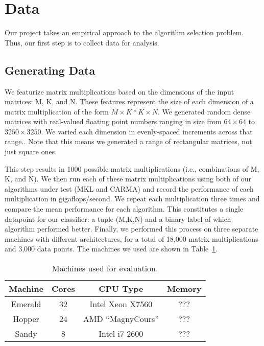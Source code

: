 \section{Data}
Our project takes an empirical approach to the algorithm selection problem.
Thus, our first step is to collect data for analysis.

\subsection{Generating Data}
We featurize matrix multiplications based on the dimensions of the input matrices: M, K, and N.
These features represent the size of each dimension of a matrix multiplication of the form $M\times{K} * K\times{N}$.
We generated random dense matrices with real-valued floating point numbers ranging in size from $64\times{64}$ to $3250\times{3250}$.
We varied each dimension in evenly-spaced increments across that range..
Note that this means we generated a range of rectangular matrices, not just square ones.

This step results in 1000 possible matrix multiplications (i.e., combinations of M, K, and N).
We then run each of these matrix multiplications using both of our algorithms under test (MKL and CARMA) and record the performance of each multiplication in gigaflops/second.
We repeat each multiplication three times and compare the mean performance for each algorithm.
This constitutes a single datapoint for our classifier: a tuple (M,K,N) and a binary label of which algorithm performed better.
Finally, we performed this process on three separate machines with different architectures, for a total of 18,000 matrix multiplications and 3,000 data points.
The machines we used are shown in Table~\ref{t:machines}.


\begin{table}[t]
    \begin{center}
        \begin{tabular}{c|c|c|c}
            Machine & Cores & CPU Type & Memory \\ \hline
            Emerald & 32 & Intel Xeon X7560 & ??? \\
            Hopper & 24 & AMD ``MagnyCours'' & ??? \\
            Sandy & 8 & Intel i7-2600 & ??? \\
        \end{tabular}
    \end{center}
    \caption{Machines used for evaluation.}
    \label{t:machines}
\end{table}

